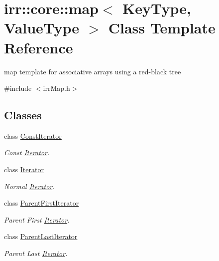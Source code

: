 \hypertarget{classirr_1_1core_1_1map}{}\section{irr\+:\+:core\+:\+:map$<$ Key\+Type, Value\+Type $>$ Class Template Reference}
\label{classirr_1_1core_1_1map}


map template for associative arrays using a red-\/black tree  




{\ttfamily \#include $<$irr\+Map.\+h$>$}

\subsection*{Classes}
\begin{DoxyCompactItemize}
\item 
class \hyperlink{classirr_1_1core_1_1map_1_1ConstIterator}{Const\+Iterator}
\begin{DoxyCompactList}\small\item\em Const \hyperlink{classirr_1_1core_1_1map_1_1Iterator}{Iterator}. \end{DoxyCompactList}\item 
class \hyperlink{classirr_1_1core_1_1map_1_1Iterator}{Iterator}
\begin{DoxyCompactList}\small\item\em Normal \hyperlink{classirr_1_1core_1_1map_1_1Iterator}{Iterator}. \end{DoxyCompactList}\item 
class \hyperlink{classirr_1_1core_1_1map_1_1ParentFirstIterator}{Parent\+First\+Iterator}
\begin{DoxyCompactList}\small\item\em Parent First \hyperlink{classirr_1_1core_1_1map_1_1Iterator}{Iterator}. \end{DoxyCompactList}\item 
class \hyperlink{classirr_1_1core_1_1map_1_1ParentLastIterator}{Parent\+Last\+Iterator}
\begin{DoxyCompactList}\small\item\em Parent Last \hyperlink{classirr_1_1core_1_1map_1_1Iterator}{Iterator}. \end{DoxyCompactList}\end{DoxyCompactItemize}
